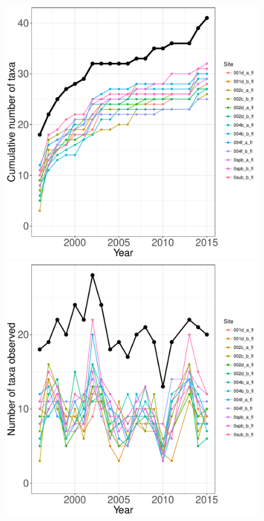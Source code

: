 \documentclass[11pt, oneside]{article}
\begin{document}
\begin{figure}[h!]
\centering
\includegraphics[scale = 0.4]{knz-grasshopper-compagnoni_species_accumulation_curve.pdf}
\includegraphics[scale = 0.4]{knz-grasshopper-compagnoni_num_taxa_over_time.pdf}

\end{figure}
\end{document}
